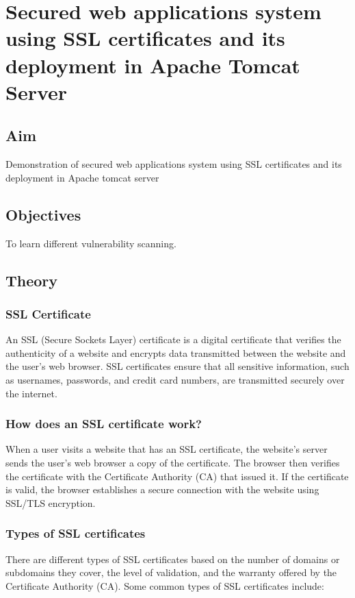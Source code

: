 \documentclass[openany]{book}
\begin{document}
\chapter{Secured web applications system using SSL certificates and its deployment in Apache Tomcat Server}
\section{Aim}

Demonstration of secured web applications system using SSL certificates and its
deployment in Apache tomcat server

\section{Objectives}
To learn different vulnerability scanning.

\section{Theory}

\subsection{SSL Certificate}
An SSL (Secure Sockets Layer) certificate is a digital certificate that verifies the authenticity of a website and encrypts data transmitted between the website and the user's web browser. SSL certificates ensure that all sensitive information, such as usernames, passwords, and credit card numbers, are transmitted securely over the internet.

\subsection{How does an SSL certificate work?}
When a user visits a website that has an SSL certificate, the website's server sends the user's web browser a copy of the certificate. The browser then verifies the certificate with the Certificate Authority (CA) that issued it. If the certificate is valid, the browser establishes a secure connection with the website using SSL/TLS encryption.

\subsection{Types of SSL certificates}
There are different types of SSL certificates based on the number of domains or subdomains they cover, the level of validation, and the warranty offered by the Certificate Authority (CA). Some common types of SSL certificates include:
\end{document}
